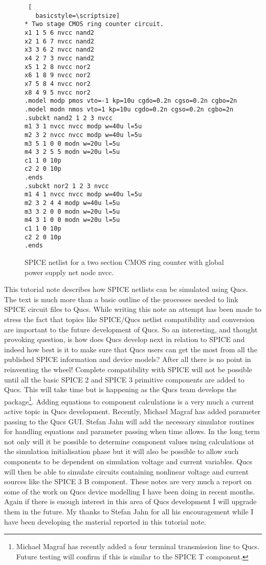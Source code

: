 \begin{figure}
 \begin{lstlisting} [
   basicstyle=\scriptsize]   
* Two stage CMOS ring counter circuit.
x1 1 5 6 nvcc nand2
x2 1 6 7 nvcc nand2
x3 3 6 2 nvcc nand2
x4 2 7 3 nvcc nand2
x5 1 2 8 nvcc nor2
x6 1 8 9 nvcc nor2
x7 5 8 4 nvcc nor2
x8 4 9 5 nvcc nor2
.model modp pmos vto=-1 kp=10u cgdo=0.2n cgso=0.2n cgbo=2n
.model modn nmos vto=1 kp=10u cgdo=0.2n cgso=0.2n cgbo=2n
.subckt nand2 1 2 3 nvcc
m1 3 1 nvcc nvcc modp w=40u l=5u
m2 3 2 nvcc nvcc modp w=40u l=5u
m3 5 1 0 0 modn w=20u l=5u
m4 3 2 5 5 modn w=20u l=5u
c1 1 0 10p
c2 2 0 10p
.ends
.subckt nor2 1 2 3 nvcc
m1 4 1 nvcc nvcc modp w=40u l=5u
m2 3 2 4 4 modp w=40u l=5u
m3 3 2 0 0 modn w=20u l=5u
m4 3 1 0 0 modn w=20u l=5u
c1 1 0 10p
c2 2 0 10p
.ends
\end{lstlisting} 
 \caption{SPICE netlist for a two section CMOS ring counter with global power supply net node nvcc.}
\label{fig:stoq_fig25}
\end{figure}   

This tutorial note describes how SPICE netlists can be simulated using Qucs. The text is much more than a basic outline of the processes needed to link SPICE circuit files to Qucs. While writing this note an attempt has been made to stress the fact that topics like SPICE/Qucs netlist compatibility and conversion are important to the future development of Qucs. So an interesting, and thought provoking question, is how does Qucs develop next in relation to SPICE and indeed how best is it to make sure that Qucs users can get the most from all the published SPICE information and device models?  After all there is no point in reinventing the wheel!  Complete compatibility with SPICE will not be possible until all the basic SPICE 2 and SPICE 3 primitive components are added to Qucs.  This will take time but is happening as the Qucs team develops the package\footnote{Michael Magraf has recently added a four terminal transmission line to Qucs. Future testing will confirm if this is similar to the SPICE T component.}.  Adding equations to component calculations is a very much a current active topic in Qucs development.  Recently, Michael Magraf has added parameter passing to the Qucs GUI. Stefan Jahn will add the necessary simulator routines for handling equations and parameter passing when time allows. In the long term not only will it be possible to determine component values using calculations at the simulation initialisation phase but it will also be possible to allow such components to be dependent on simulation voltage and current variables. Qucs will then be able to simulate circuits containing nonlinear voltage and current sources like the SPICE 3 B component.  These notes are very much a report on some of the work on Qucs device modelling I have been doing in recent months.  Again if there is enough interest in this area of Qucs development I will upgrade them in the future.  My thanks to Stefan Jahn for all his encouragement while I have been developing the material reported in this tutorial note.

